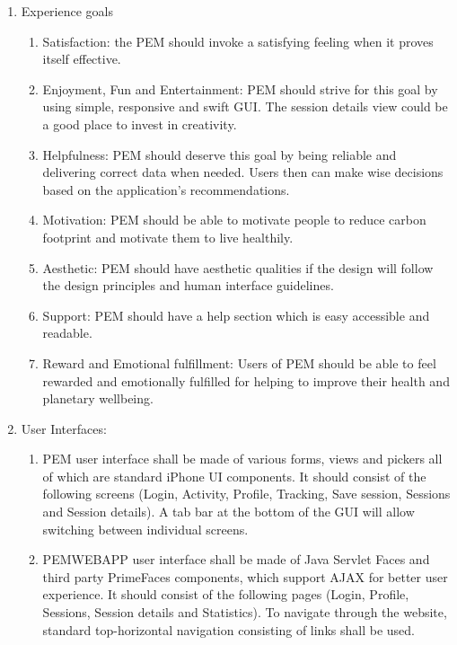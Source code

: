 \documentclass[12pt, a4paper]{report}   %
\begin{document}
\begin{enumerate}
\begin{enumerate}
\begin{enumerate}
		\item Experience goals
		\begin{enumerate}
			\item Satisfaction: the PEM should invoke a satisfying feeling when it proves itself effective.
			\item Enjoyment, Fun and Entertainment: PEM should strive for this goal by using simple, responsive and swift GUI. The session details view could be a good place to invest in creativity.
			\item Helpfulness: PEM should deserve this goal by being reliable and delivering correct data when needed. Users then can make wise decisions based on the application's recommendations.
			\item Motivation: PEM should be able to motivate people to reduce carbon footprint and motivate them to live healthily.
			\item Aesthetic: PEM should have aesthetic qualities if the design will follow the design principles and human interface guidelines.
			\item Support: PEM should have a help section which is easy accessible and readable.
			\item Reward and Emotional fulfillment: Users of PEM should be able to feel rewarded and emotionally fulfilled for helping to improve their health and planetary wellbeing.\\
		\end{enumerate}
		
		\item User Interfaces:
		\begin{enumerate}
			\item PEM user interface shall be made of various forms, views and pickers all of which are standard iPhone UI components. It should consist of the following screens (Login, Activity, Profile, Tracking, Save session, Sessions and Session details). A tab bar at the bottom of the GUI will allow switching between individual screens.\\
			\item PEMWEBAPP user interface shall be made of Java Servlet Faces and third party PrimeFaces components, which support AJAX for better user experience. It should consist of the following pages (Login, Profile, Sessions, Session details and Statistics). To navigate through the website, standard top-horizontal navigation consisting of links shall be used.\\
			\end{enumerate}
	

\end{enumerate}
\end{enumerate}
\end{enumerate}
\end{document}
